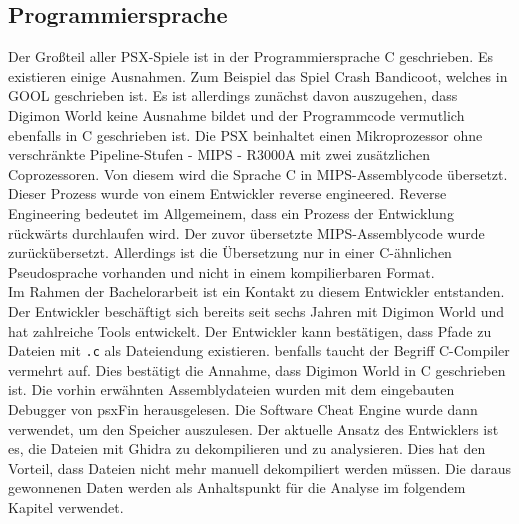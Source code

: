 \subsection{Programmiersprache}
Der Großteil aller \ac{PSX}-Spiele ist in der Programmiersprache C geschrieben\cite{retro-programming-c}.
Es existieren einige Ausnahmen.
Zum Beispiel das Spiel Crash Bandicoot, welches in \ac{GOOL} geschrieben ist\cite{gool}.
Es ist allerdings zunächst davon auszugehen, dass Digimon World keine Ausnahme bildet und der Programmcode vermutlich ebenfalls in C geschrieben ist.
Die \ac{PSX} beinhaltet einen Mikroprozessor ohne verschränkte Pipeline-Stufen - \ac{MIPS} - R3000A mit zwei zusätzlichen Coprozessoren\cite{psx-architecture}.
Von diesem wird die Sprache C in \ac{MIPS}-Assemblycode übersetzt.
Dieser Prozess wurde von einem Entwickler reverse engineered.
Reverse Engineering bedeutet im Allgemeinem, dass ein Prozess der Entwicklung rückwärts durchlaufen wird.
Der zuvor übersetzte \ac{MIPS}-Assemblycode wurde zurückübersetzt.
Allerdings ist die Übersetzung nur in einer C-ähnlichen Pseudosprache vorhanden und nicht in einem kompilierbaren Format\cite{github-dw1code}. \\

Im Rahmen der Bachelorarbeit ist ein Kontakt zu diesem Entwickler entstanden.
Der Entwickler beschäftigt sich bereits seit sechs Jahren mit Digimon World und hat zahlreiche Tools entwickelt.
Der Entwickler kann bestätigen, dass Pfade zu Dateien mit \texttt{.c} als Dateiendung existieren.
benfalls taucht der Begriff C-Compiler vermehrt auf.
Dies bestätigt die Annahme, dass Digimon World in C geschrieben ist.
Die vorhin erwähnten Assemblydateien wurden mit dem eingebauten Debugger von psxFin herausgelesen\cite{psxfin}.
Die Software Cheat Engine wurde dann verwendet, um den Speicher auszulesen\cite{cheatengine}.
Der aktuelle Ansatz des Entwicklers ist es, die Dateien mit Ghidra zu dekompilieren und zu analysieren\cite{ghidra}.
Dies hat den Vorteil, dass Dateien nicht mehr manuell dekompiliert werden müssen.
Die daraus gewonnenen Daten werden als Anhaltspunkt für die Analyse im folgendem Kapitel verwendet.\\
